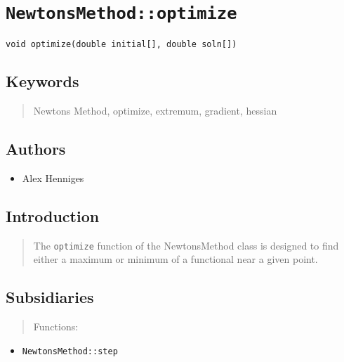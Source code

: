 \documentclass[10pt]{article}%
\begin{document}

\section*{\texttt{NewtonsMethod::optimize}}

\label{f0}{\small{\begin{verbatim} 
void optimize(double initial[], double soln[])
\end{verbatim}
}}

\subsection*{Keywords}

\begin{quotation} Newtons Method, optimize, extremum, gradient, hessian\end{quotation}

\subsection*{Authors}

\begin{itemize}\item  Alex Henniges
\end{itemize}

\subsection*{Introduction}

\begin{quotation} The \texttt{optimize} function of the NewtonsMethod class is designed to find either a maximum or minimum of a functional near a given point.\end{quotation}

\subsection*{Subsidiaries}

\begin{quotation} Functions:\end{quotation}
\begin{itemize}
\item  \texttt{NewtonsMethod::step}
\end{itemize}
\begin{quotation} \end{quotation}
\end{document}
